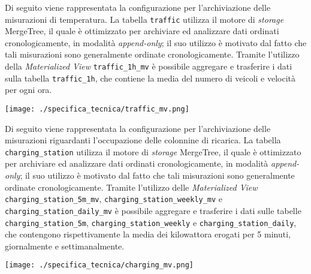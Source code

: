 Di seguito viene rappresentata la configurazione per l'archiviazione delle misurazioni di temperatura. La tabella \texttt{traffic} utilizza il motore di \textit{storage}
MergeTree, il quale è ottimizzato per archiviare ed analizzare dati ordinati cronologicamente, in modalità \textit{append-only}; il suo
utilizzo è motivato dal fatto che tali misurazioni sono generalmente ordinate cronologicamente.
Tramite l'utilizzo della \textit{Materialized View} \texttt{traffic\_1h\_mv}
è possibile aggregare e trasferire i dati sulla tabella \texttt{traffic\_1h}, che contiene la media del numero di veicoli e velocità per ogni ora.
\begin{center}
	\texttt{[image: ./specifica\_tecnica/traffic\_mv.png]}
\end{center}

Di seguito viene rappresentata la configurazione per l'archiviazione delle misurazioni riguardanti l'occupazione delle colonnine di ricarica.
La tabella \texttt{charging\_station} utilizza il motore di \textit{storage} MergeTree, il quale è ottimizzato per archiviare ed analizzare dati ordinati cronologicamente,
in modalità \textit{append-only}; il suo utilizzo è motivato dal fatto che tali misurazioni sono generalmente ordinate cronologicamente.
Tramite l'utilizzo delle \textit{Materialized View} \texttt{charging\_station\_5m\_mv}, \texttt{charging\_station\_weekly\_mv} e \\\texttt{charging\_station\_daily\_mv}
è possibile aggregare e trasferire i dati sulle tabelle \texttt{charging\_station\_5m}, \texttt{charging\_station\_weekly} e \texttt{charging\_station\_daily},
che contengono rispettivamente la media dei kilowattora erogati per 5 minuti, giornalmente e settimanalmente.
\begin{center}
	\texttt{[image: ./specifica\_tecnica/charging\_mv.png]}
\end{center}

